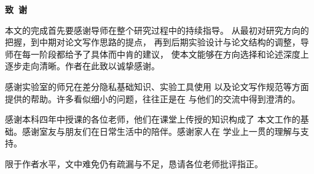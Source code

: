 \clearpage{}
\begin{center}
    \bfseries {} 致~谢
\end{center}

\par 本文的完成首先要感谢导师在整个研究过程中的持续指导。
从最初对研究方向的把握，到中期对论文写作思路的提点，
再到后期实验设计与论文结构的调整，导师在每一阶段都给予了具体而中肯的建议，
使本文能够在方向选择和论述深度上逐步走向清晰。作者在此致以诚挚感谢。

\par 感谢实验室的师兄在差分隐私基础知识、实验工具使用
以及论文写作规范等方面提供的帮助。许多看似细小的问题，往往正是在
与他们的交流中得到澄清的。

\par 感谢本科四年中授课的各位老师，他们在课堂上传授的知识构成了
本文工作的基础。感谢室友与朋友们在日常生活中的陪伴。感谢家人在
学业上一贯的理解与支持。

\par 限于作者水平，文中难免仍有疏漏与不足，恳请各位老师批评指正。